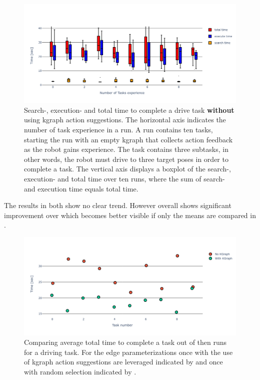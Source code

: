 \begin{figure}[H]
    \centering
    \includegraphics[width=\textwidth]{figures/results/random_drive_time_no_kgraph}
    \caption{Search-, execution- and total time to complete a drive task \textbf{without} using \ac{kgraph} action suggestions. The horizontal axis indicates the number of task experience in a run. A run contains ten tasks, starting the run with an empty \ac{kgraph} that collects action feedback as the robot gains experience. The task contains three subtasks, in other words, the robot must drive to three target poses in order to complete a task. The vertical axis displays a boxplot of the search-, execution- and total time over ten runs, where the sum of search- and execution time equals total time.}%
   \label{fig:random_drive_time_no_kgraph}
\end{figure}


The results in both  show no clear trend. However overall  shows significant improvement over  which becomes better visible if only the means are compared in .\bs

\begin{figure}[H]
    \centering
    \includegraphics[width=\textwidth]{figures/results/random_drive_time_vs}
    \caption{Comparing average total time to complete a task out of then runs for a driving task. For the edge parameterizations once with the use of \ac{kgraph} action suggestions are leveraged indicated by  and once with random selection indicated by .}\label{fig:random_drive_time_vs}
\end{figure}

